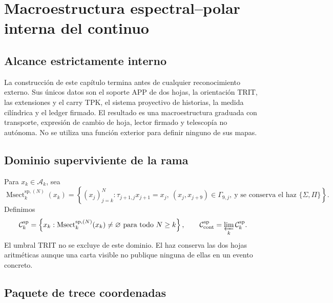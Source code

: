 \iffalse
\chapter{Macroestructura espectral--polar interna del continuo}
\label{chap:continuo-macro-sp-interna}

\section{Alcance estrictamente interno}

La construcción de este capítulo termina antes de cualquier reconocimiento
externo. Sus únicos datos son el soporte APP de dos hojas, la orientación
TRIT, las extensiones y el carry TPK, el sistema proyectivo de historias, la
medida cilíndrica y el ledger firmado. El resultado es una macroestructura
graduada con transporte, expresión de cambio de hoja, lector firmado y
telescopía no autónoma. No se utiliza una función exterior para definir
ninguno de sus mapas.

\section{Dominio superviviente de la rama}

Para \(x_k\in\mathcal A_k\), sea
\begin{equation}
\label{eq:continuo-sp-msect-n}
 \operatorname{Msect}^{\mathrm{sp},(N)}_k(x_k)
 =\left\{(x_j)_{j=k}^{N}:
 \tau_{j+1,j}x_{j+1}=x_j,
 \ (x_j,x_{j+9})\in\Gamma_{9,j},
 \ \text{y se conserva el haz }\{\Sigma,\Pi\}\right\}.
\end{equation}
Definimos
\begin{equation}
\label{eq:continuo-sp-dominio-superviviente}
 \mathcal C_k^{\mathrm{sp}}
 =\left\{x_k:
 \operatorname{Msect}^{\mathrm{sp},(N)}_k(x_k)\neq\varnothing
 \text{ para todo }N\geq k\right\},
 \qquad
 \mathcal C_{\rm cont}^{\mathrm{sp}}
 =\varprojlim_k\mathcal C_k^{\mathrm{sp}}.
\end{equation}
El umbral TRIT no se excluye de este dominio. El haz conserva las dos hojas
aritméticas aunque una carta visible no publique ninguna de ellas en un
evento concreto.

\section{Paquete de trece coordenadas}

